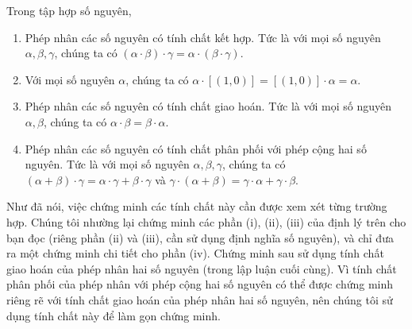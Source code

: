 \begin{theorem}\label{theorem:property-of-integers-multiplication}
    Trong tập hợp số nguyên,
    \begin{enumerate}[label={(\roman*)}]
        \item Phép nhân các số nguyên có tính chất kết hợp. Tức là với mọi số nguyên $\alpha, \beta, \gamma$, chúng ta có $(\alpha\cdot\beta)\cdot\gamma = \alpha\cdot(\beta\cdot\gamma)$.
        \item Với mọi số nguyên $\alpha$, chúng ta có $\alpha\cdot [(1, 0)] = [(1, 0)]\cdot\alpha = \alpha$.
        \item Phép nhân các số nguyên có tính chất giao hoán. Tức là với mọi số nguyên $\alpha, \beta$, chúng ta có $\alpha\cdot\beta = \beta\cdot\alpha$.
        \item Phép nhân các số nguyên có tính chất phân phối với phép cộng hai số nguyên. Tức là với mọi số nguyên $\alpha, \beta, \gamma$, chúng ta có $(\alpha + \beta)\cdot\gamma = \alpha\cdot\gamma + \beta\cdot\gamma$ và $\gamma\cdot(\alpha + \beta) = \gamma\cdot\alpha + \gamma\cdot\beta$.
    \end{enumerate}
\end{theorem}

Như đã nói, việc chứng minh các tính chất này cần được xem xét từng trường hợp. Chúng tôi nhường lại chứng minh các phần (i), (ii), (iii) của định lý trên cho bạn đọc (riêng phần (ii) và (iii), cần sử dụng định nghĩa số nguyên), và chỉ đưa ra một chứng minh chi tiết cho phần (iv). Chứng minh sau sử dụng tính chất giao hoán của phép nhân hai số nguyên (trong lập luận cuối cùng). Vì tính chất phân phối của phép nhân với phép cộng hai số nguyên có thể được chứng minh riêng rẽ với tính chất giao hoán của phép nhân hai số nguyên, nên chúng tôi sử dụng tính chất này để làm gọn chứng minh.

